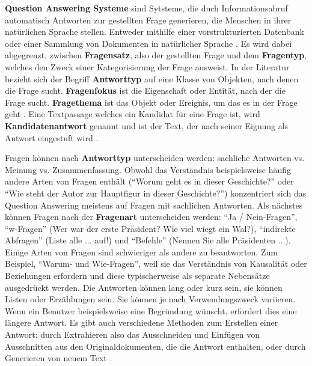 \documentclass[
        ngerman,
        paper=a4,
        numbers=noendperiod,
]{scrreprt}
\begin{document}
\textbf{Question Answering Systeme} sind Sytsteme, die duch Informationsabruf automatisch Antworten zur gestellten Frage generieren, die Menschen in ihrer natürlichen Sprache stellen. Entweder mithilfe einer vorstrukturierten Datenbank oder einer Sammlung von Dokumenten in natürlicher Sprache \citep{Chali2011ImprovingKernels}\citep{Dwivedi2013ResearchSystem}\citep{Ansari2016IntelligentNetwork}\citep{Lende2016QuestionTechniques}. Es wird dabei abgegrenzt, zwischen \textbf{Fragensatz}, also der gestellten Frage und dem \textbf{Fragentyp}, welches den Zweck einer Kategorisierung der Frage ausweist. In der Literatur bezieht sich der Begriff \textbf{Antworttyp} auf eine Klasse von Objekten, nach denen die Frage sucht. \textbf{Fragenfokus} ist die Eigenschaft oder Entität, nach der die Frage sucht. \textbf{Fragethema} ist das Objekt oder Ereignis, um das es in der Frage geht \citep[S. 2]{CalijorneSoares2018ASystems}. Eine Textpassage welches ein Kandidat für eine Frage ist, wird \textbf{Kandidatenantwort} genannt und ist der Text, der nach seiner Eignung als Antwort eingestuft wird \citep{RetrievalOpen-DomainQuestion-Answering}.

Fragen können nach \textbf{Antworttyp} unterscheiden werden: sachliche Antworten vs. Meinung vs. Zusammenfassung. Obwohl das Verständnis beispielsweise häufig andere Arten von Fragen enthält (\enquote{Worum geht es in dieser Geschichte?} oder \enquote{Wie steht der Autor zur Hauptfigur in dieser Geschichte?}) konzentriert sich das Question Answering meistens auf Fragen mit sachlichen Antworten. Als nächstes können Fragen nach der \textbf{Fragenart} unterscheiden werden: \enquote{Ja / Nein-Fragen}, \enquote{w-Fragen} (Wer war der erste Präsident? Wie viel wiegt ein Wal?), \enquote{indirekte Abfragen} (Liste alle ... auf!) und \enquote{Befehle} (Nennen Sie alle Präsidenten ...). Einige Arten von Fragen sind schwieriger als andere zu beantworten. Zum Beispiel, \enquote{Warum- und Wie-Fragen}, weil sie das Verständnis von Kausalität oder Beziehungen erfordern und diese typischerweise als separate Nebensätze ausgedrückt werden. Die Antworten können lang oder kurz sein, sie können Listen oder Erzählungen sein. Sie können je nach Verwendungszweck variieren. Wenn ein Benutzer beispielsweise eine Begründung wünscht, erfordert dies eine längere Antwort. Es gibt auch verschiedene Methoden zum Erstellen einer Antwort: durch Extrahieren also das Ausschneiden und Einfügen von Ausschnitten aus den Originaldokumenten, die die Antwort enthalten, oder durch Generieren von neuem Text \citep [S. 277-278]{Hirschman2001NaturalHere}. 
\end{document}
